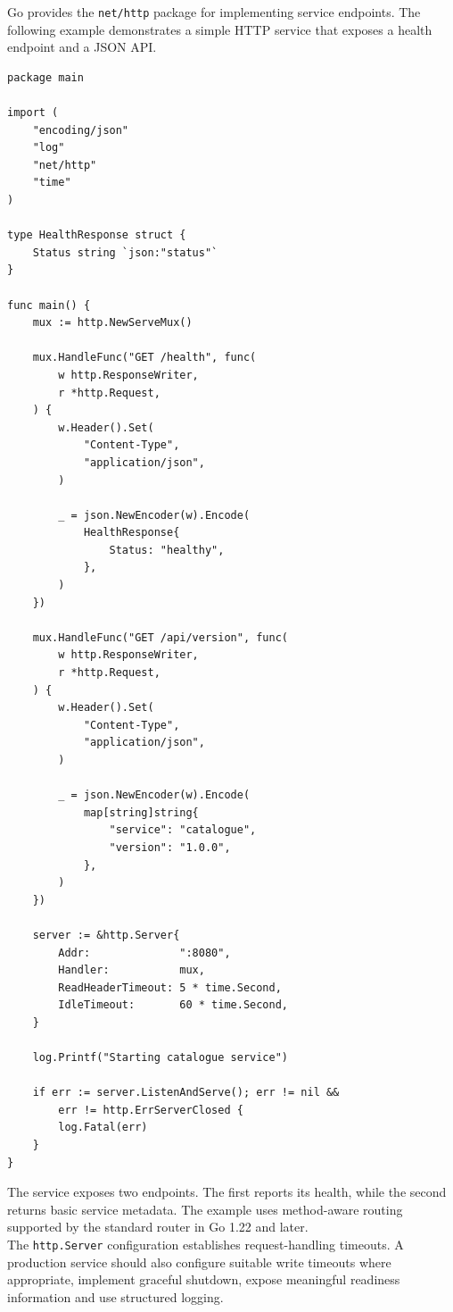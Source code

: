 Go provides the \texttt{net/http} package for implementing service endpoints. The following example demonstrates a simple HTTP service that exposes a health endpoint and a JSON API.

\begin{lstlisting}
package main

import (
    "encoding/json"
    "log"
    "net/http"
    "time"
)

type HealthResponse struct {
    Status string `json:"status"`
}

func main() {
    mux := http.NewServeMux()

    mux.HandleFunc("GET /health", func(
        w http.ResponseWriter,
        r *http.Request,
    ) {
        w.Header().Set(
            "Content-Type",
            "application/json",
        )

        _ = json.NewEncoder(w).Encode(
            HealthResponse{
                Status: "healthy",
            },
        )
    })

    mux.HandleFunc("GET /api/version", func(
        w http.ResponseWriter,
        r *http.Request,
    ) {
        w.Header().Set(
            "Content-Type",
            "application/json",
        )

        _ = json.NewEncoder(w).Encode(
            map[string]string{
                "service": "catalogue",
                "version": "1.0.0",
            },
        )
    })

    server := &http.Server{
        Addr:              ":8080",
        Handler:           mux,
        ReadHeaderTimeout: 5 * time.Second,
        IdleTimeout:       60 * time.Second,
    }

    log.Printf("Starting catalogue service")

    if err := server.ListenAndServe(); err != nil &&
        err != http.ErrServerClosed {
        log.Fatal(err)
    }
}
\end{lstlisting}

The service exposes two endpoints. The first reports its health, while the second returns basic service metadata. The example uses method-aware routing supported by the standard router in Go 1.22 and later.\\

The \texttt{http.Server} configuration establishes request-handling timeouts. A production service should also configure suitable write timeouts where appropriate, implement graceful shutdown, expose meaningful readiness information and use structured logging.\\

